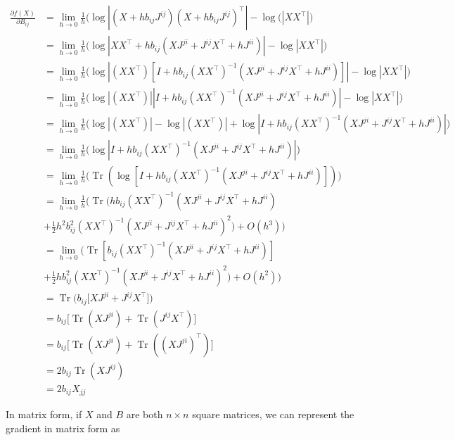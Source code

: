 \documentclass[12pt]{article}
\theoremstyle{definition}
\DeclareMathOperator{\Tr}{Tr}
\begin{document}
\begin{equation}
    \label{eqn:gradLogDetElement}
    \begin{split}
        \frac{\partial f(X)}{\partial B_{ij}} &= \lim_{h \to 0} \frac{1}{h}\bigg(\log|(X + hb_{ij}J^{ij}) (X + hb_{ij}J^{ij})^\top| - \log(|XX^\top| \bigg) \\
        &= \lim_{h \to 0} \frac{1}{h} \bigg(\log|XX^\top + hb_{ij}(XJ^{ji} + J^{ij}X^\top + hJ^{ii})| - \log|XX^\top| \bigg) \\ 
        & = \lim_{h \to 0} \frac{1}{h} \bigg(\log|(XX^\top)[I + hb_{ij}(XX^\top)^{-1}(XJ^{ji} + J^{ij}X^\top + hJ^{ii})]| - \log|XX^\top| \bigg) \\ 
        & = \lim_{h \to 0} \frac{1}{h} \bigg(\log|(XX^\top)||I + hb_{ij}(XX^\top)^{-1}(XJ^{ji} + J^{ij}X^\top + hJ^{ii})| - \log|XX^\top| \bigg) \\ 
        & = \lim_{h \to 0} \frac{1}{h} \bigg( \log|(XX^\top)| - \log|(XX^\top)| + \log|I + hb_{ij}(XX^\top)^{-1}(XJ^{ji} + J^{ij}X^\top + hJ^{ii})| \bigg) \\
        & = \lim_{h \to 0} \frac{1}{h} \bigg(\log|I + hb_{ij}(XX^\top)^{-1}(XJ^{ji} + J^{ij}X^\top + hJ^{ii})| \bigg) \\
        & = \lim_{h \to 0} \frac{1}{h} \bigg( \Tr (\log[I + hb_{ij}(XX^\top)^{-1}(XJ^{ji} + J^{ij}X^\top + hJ^{ii})]) \bigg) \\ 
        & = \lim_{h \to 0} \frac{1}{h} \bigg( \Tr (hb_{ij}(XX^\top)^{-1}(XJ^{ji} + J^{ij}X^\top + hJ^{ii}) \\ 
        & + \frac{1}{2} h^2 b_{ij}^2 (XX^\top)^{-1}(XJ^{ji} + J^{ij}X^\top + hJ^{ii})^2) + O(h^3) \bigg) \\ 
        & = \lim_{h \to 0} \bigg(\Tr [b_{ij}(XX^\top)^{-1}(XJ^{ji} + J^{ij}X^\top + hJ^{ii})] \\ 
        & + \frac{1}{2} h b_{ij}^2 (XX^\top)^{-1}(XJ^{ji} + J^{ij}X^\top + hJ^{ii})^2) + O(h^2) \bigg) \\ 
        & = \Tr\big(b_{ij}[XJ^{ji} + J^{ij}X^\top\big]) \\ 
        & = b_{ij}\big[\Tr(XJ^{ji}) + \Tr(J^{ij}X^\top)\big] \\ 
        & = b_{ij}\big[\Tr(XJ^{ji}) + \Tr((XJ^{ji})^\top)\big] \\ 
        & = 2b_{ij} \Tr(XJ^{ij}) \\ 
        & = 2 b_{ij}X_{jj}
    \end{split}
\end{equation}

In matrix form, if $X$ and $B$ are both $n \times n$ square matrices, we can represent the gradient in matrix form as
\end{document}
